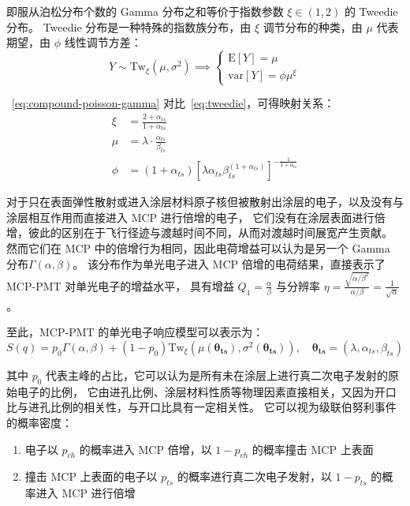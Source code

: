 即服从泊松分布个数的 Gamma 分布之和等价于指数参数 $\xi\in(1, 2)$ 的 Tweedie 分布。
Tweedie 分布是一种特殊的指数族分布，由 $\xi$ 调节分布的种类，由 $\mu$ 代表期望，由 $\phi$ 线性调节方差：
\begin{equation}
    Y\sim\mathrm{Tw}_{\xi}(\mu, \sigma^2)\implies 
    \left\{
        \begin{array}{c}
        \mathrm{E}[Y]=\mu \\
        \mathrm{var}[Y]=\phi\mu^{\xi}
        \end{array}
    \right.
    \label{eq:tweedie}
\end{equation}

~\eqref{eq:compound-poisson-gamma} 对比~\eqref{eq:tweedie}，可得映射关系：
\begin{align}
    \xi & = \frac{2+\alpha_{ts}}{1+\alpha_{ts}}\\
    \mu & = \lambda\cdot\frac{\alpha_{ts}}{\beta_{ts}}\\
    \phi & = (1+\alpha_{ts})\left[\lambda\alpha_{ts}\beta_{ts}^{(1+\alpha_{ts})}\right]^{-\frac{1}{1+\alpha_{ts}}}
\end{align}

对于只在表面弹性散射或进入涂层材料原子核但被散射出涂层的电子，以及没有与涂层相互作用而直接进入 MCP 进行倍增的电子，
它们没有在涂层表面进行倍增，彼此的区别在于飞行径迹与渡越时间不同，从而对渡越时间展宽产生贡献。
然而它们在 MCP 中的倍增行为相同，因此电荷增益可以认为是另一个 Gamma 分布$\Gamma(\alpha, \beta)$。
该分布作为单光电子进入 MCP 倍增的电荷结果，直接表示了 MCP-PMT 对单光电子的增益水平，
具有增益 $Q_1=\frac{\alpha}{\beta}$ 与分辨率 $\eta=\frac{\sqrt{\alpha/\beta^2}}{\alpha/\beta}=\frac{1}{\sqrt{\alpha}}$。

至此，MCP-PMT 的单光电子响应模型可以表示为：
\begin{equation}
    S(q)=p_0\Gamma(\alpha, \beta)+(1-p_0)\mathrm{Tw}_{\xi}
    \left(\mu(\boldsymbol{\theta_{ts}}),\sigma^2(\boldsymbol{\theta_{ts}})\right),\quad
    \boldsymbol{\theta_{ts}}=(\lambda, \alpha_{ts},\beta_{ts})
\end{equation}

其中 $p_0$ 代表主峰的占比，它可以认为是所有未在涂层上进行真二次电子发射的原始电子的比例，
它由进孔比例、涂层材料性质等物理因素直接相关，又因为开口比与进孔比例的相关性，与开口比具有一定相关性。
它可以视为级联伯努利事件的概率密度：
\begin{enumerate}
    \item 电子以 $p_{ch}$ 的概率进入 MCP 倍增，以 $1-p_{ch}$ 的概率撞击 MCP 上表面
    \item 撞击 MCP 上表面的电子以 $p_{ts}$ 的概率进行真二次电子发射，以 $1-p_{ts}$ 的概率进入 MCP 进行倍增
\end{enumerate}

